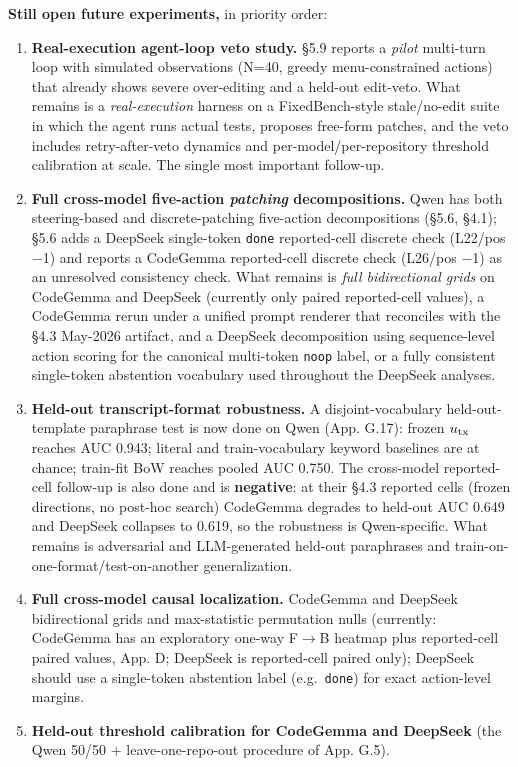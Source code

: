 \documentclass[
  11pt,
  a4paper]{article}
\providecommand{\tightlist}{%
  \setlength{\itemsep}{0pt}\setlength{\parskip}{0pt}}
\begin{document}
\textbf{Still open future experiments,} in priority order:

\begin{enumerate}
\def\labelenumi{\arabic{enumi}.}
\tightlist
\item
  \textbf{Real-execution agent-loop veto study.} \S{}5.9 reports a
  \emph{pilot} multi-turn loop with simulated observations (N=40, greedy
  menu-constrained actions) that already shows severe over-editing and a
  held-out edit-veto. What remains is a \emph{real-execution} harness on
  a FixedBench-style stale/no-edit suite
  \citep{fixedbench2025, yang2024sweagent} in which the agent runs
  actual tests, proposes free-form patches, and the veto includes
  retry-after-veto dynamics and per-model/per-repository threshold
  calibration at scale. The single most important follow-up.
\item
  \textbf{Full cross-model five-action \emph{patching} decompositions.}
  Qwen has both steering-based and discrete-patching five-action
  decompositions (\S{}5.6, \S{}4.1); \S{}5.6 adds a DeepSeek single-token
  \texttt{done} reported-cell discrete check (L22/pos \ensuremath{-}1) and reports a
  CodeGemma reported-cell discrete check (L26/pos \ensuremath{-}1) as an unresolved
  consistency check. What remains is \emph{full bidirectional grids} on
  CodeGemma and DeepSeek (currently only paired reported-cell values), a
  CodeGemma rerun under a unified prompt renderer that reconciles with
  the \S{}4.3 May-2026 artifact, and a DeepSeek decomposition using
  sequence-level action scoring for the canonical multi-token
  \texttt{noop} label, or a fully consistent single-token abstention
  vocabulary used throughout the DeepSeek analyses.
\item
  \textbf{Held-out transcript-format robustness.} A disjoint-vocabulary
  held-out-template paraphrase test is now done on Qwen (App. G.17):
  frozen \(u_{\rm tx}\) reaches AUC 0.943; literal and train-vocabulary
  keyword baselines are at chance; train-fit BoW reaches pooled AUC
  0.750. The cross-model reported-cell follow-up is also done and is
  \textbf{negative}: at their \S{}4.3 reported cells (frozen directions, no
  post-hoc search) CodeGemma degrades to held-out AUC 0.649 and DeepSeek
  collapses to 0.619, so the robustness is Qwen-specific. What remains
  is adversarial and LLM-generated held-out paraphrases and
  train-on-one-format/test-on-another generalization.
\item
  \textbf{Full cross-model causal localization.} CodeGemma and DeepSeek
  bidirectional grids and max-statistic permutation nulls (currently:
  CodeGemma has an exploratory one-way F\ensuremath{\rightarrow}B heatmap plus reported-cell
  paired values, App. D; DeepSeek is reported-cell paired only);
  DeepSeek should use a single-token abstention label
  (e.g.~\texttt{done}) for exact action-level margins.
\item
  \textbf{Held-out threshold calibration for CodeGemma and DeepSeek}
  (the Qwen 50/50 + leave-one-repo-out procedure of App. G.5).
\end{enumerate}
\end{document}
